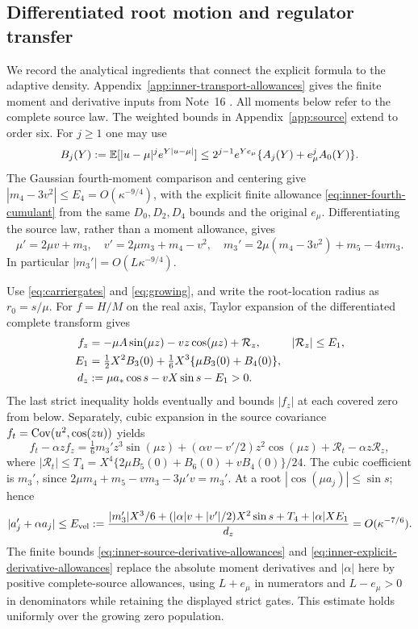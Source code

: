 \subsection{Differentiated root motion and regulator transfer}
We record the analytical ingredients that connect the explicit formula
to the adaptive density. Appendix~\ref{app:inner-transport-allowances}
gives the finite moment and derivative inputs from Note~16 \cite{n16}.
All moments below refer to the complete source law.
The weighted bounds in Appendix~\ref{app:source} extend to order six.
For $j\ge1$ one may use
\[
 B_j(Y):=\mathbb E[|u-\mu|^je^{Y|u-\mu|}]
 \le2^{j-1}e^{Ye_\mu}\{A_j(Y)+e_\mu^jA_0(Y)\}.
\]
The Gaussian fourth-moment comparison and centering give
$|m_4-3v^2|\le E_4=O(\kappa^{-9/4})$, with the explicit finite
allowance \eqref{eq:inner-fourth-cumulant} from the same $D_0,D_2,D_4$
bounds and the original $e_\mu$.
Differentiating the source law, rather than a moment allowance, gives
\begin{equation}
 \mu'=2\mu v+m_3,\quad v'=2\mu m_3+m_4-v^2,\quad
 m_3'=2\mu(m_4-3v^2)+m_5-4vm_3.
 \label{eq:momentderivatives}
\end{equation}
In particular $|m_3'|=O(L\kappa^{-9/4})$.

Use \eqref{eq:carriergates} and \eqref{eq:growing}, and write the
root-location radius as $r_0=s/\mu$. For $f=H/M$ on the real axis,
Taylor expansion of the differentiated complete transform gives
\begin{align}
 f_z&=-\mu A\sin(\mu z)-vz\cos(\mu z)+\mathcal R_z,
 &|\mathcal R_z|&\le E_1,\notag\\
 E_1&=\tfrac12X^2B_3(0)+\tfrac16X^3\{\mu B_3(0)+B_4(0)\},
 \label{eq:derivativegate}\\
 d_z&:=\mu a_*\cos s-vX\sin s-E_1>0.\notag
\end{align}
The last strict inequality holds eventually and bounds $|f_z|$ at
each covered zero from below. Separately, cubic expansion in the
source covariance $f_t=\operatorname{Cov}(u^2,\cos(zu))$ yields
\begin{equation}
 f_t-\alpha zf_z=\tfrac16m_3'z^3\sin(\mu z)
 +(\alpha v-v'/2)z^2\cos(\mu z)
 +\mathcal R_t-\alpha z\mathcal R_z,
 \label{eq:driftcancellation}
\end{equation}
where
$|\mathcal R_t|\le T_4=X^4\{2\mu B_5(0)+B_6(0)+vB_4(0)\}/24$.
The cubic coefficient is $m_3'$, since
$2\mu m_4+m_5-vm_3-3\mu'v=m_3'$.
At a root $|\cos(\mu a_j)|\le\sin s$; hence
\begin{equation}
 |a_j'+\alpha a_j|\le E_{\rm vel}:=
 \frac{|m_3'|X^3/6+(|\alpha|v+|v'|/2)X^2\sin s
                       +T_4+|\alpha|XE_1}{d_z}
 =O(\kappa^{-7/6}).
 \label{eq:velocitybound}
\end{equation}
The finite bounds \eqref{eq:inner-source-derivative-allowances} and
\eqref{eq:inner-explicit-derivative-allowances} replace the absolute
moment derivatives and $|\alpha|$ here by positive complete-source
allowances, using $L+e_\mu$ in numerators and $L-e_\mu>0$ in
denominators while retaining the displayed strict gates. This estimate
holds uniformly over the growing zero population.

